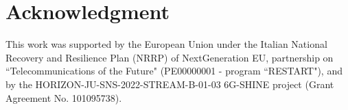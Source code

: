\documentclass[10pt, final, twocolumn, twoside, romanappendices]{IEEEtran}
\begin{document}
\section*{Acknowledgment}
This work was supported by the European Union under the Italian National Recovery and Resilience Plan (NRRP) of NextGeneration EU, partnership on ``Telecommunications of the Future" (PE00000001 - program ``RESTART"), and by the HORIZON-JU-SNS-2022-STREAM-B-01-03 6G-SHINE project (Grant Agreement No. 101095738).


%
%



\end{document}
